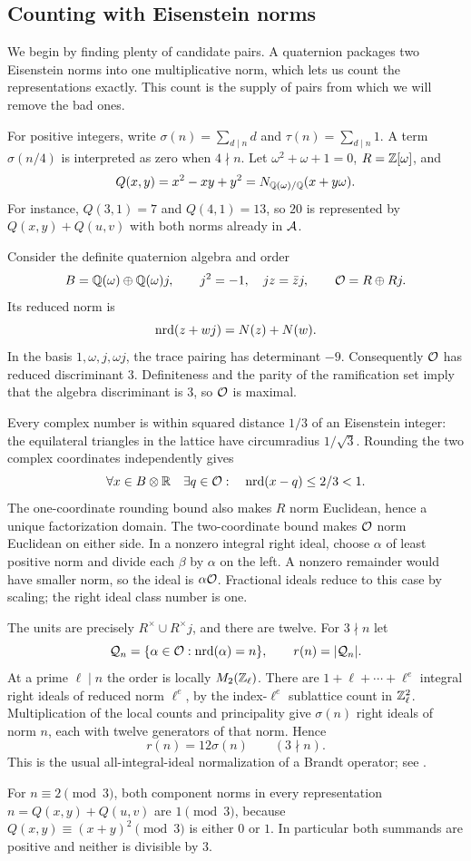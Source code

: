 \subsection{Counting with Eisenstein norms}\label{sec:norm}
We begin by finding plenty of candidate pairs. A quaternion packages two
Eisenstein norms into one multiplicative norm, which lets us count the
representations exactly. This count is the supply of pairs from which we
will remove the bad ones.

For positive integers, write $\sigma(n)=\sum_{d\mid n}d$ and
$\tau(n)=\sum_{d\mid n}1$. A term $\sigma(n/4)$ is interpreted as zero
when $4\nmid n$. Let $\omega^2+\omega+1=0$, $R=\Z[\omega]$, and
\[
Q(x,y)=x^2-xy+y^2=N_{\Q(\omega)/\Q}(x+y\omega).
\]
For instance, $Q(3,1)=7$ and $Q(4,1)=13$, so $20$ is represented by
$Q(x,y)+Q(u,v)$ with both norms already in $\AA$.

Consider the definite quaternion algebra and order
\[
B=\Q(\omega)\oplus\Q(\omega)j,\qquad
j^2=-1,\quad jz=\bar z j,\qquad \OO=R\oplus Rj.
\]
Its reduced norm is
\[
\nrd(z+w j)=N(z)+N(w).
\]
In the basis $1,\omega,j,\omega j$, the trace pairing has determinant $-9$.
Consequently $\OO$ has reduced discriminant $3$. Definiteness and the parity
of the ramification set imply that the algebra discriminant is $3$, so
$\OO$ is maximal.

Every complex number is within squared distance $1/3$ of an Eisenstein
integer: the equilateral triangles in the lattice have circumradius
$1/\sqrt3$. Rounding the two complex coordinates independently gives
\[
\forall x\in B\otimes\mathbb R\quad\exists q\in\OO:
\quad\nrd(x-q)\le2/3<1.
\]
The one-coordinate rounding bound also makes $R$ norm Euclidean, hence
a unique factorization domain. The two-coordinate bound makes $\OO$
norm Euclidean on either side. In a nonzero integral right
ideal, choose $\alpha$ of least positive norm and divide each $\beta$ by
$\alpha$ on the left. A nonzero remainder would have smaller norm, so the
ideal is $\alpha\OO$. Fractional ideals reduce to this case by scaling;
the right ideal class number is one.

The units are precisely $R^\times\cup R^\times j$, and there are twelve.
For $3\nmid n$ let
\[
\mathcal Q_n=\{\alpha\in\OO:\nrd(\alpha)=n\},\qquad r(n)=|\mathcal Q_n|.
\]
At a prime $\ell\mid n$ the order is locally $M_2(\Z_\ell)$. There are
$1+\ell+\cdots+\ell^e$ integral right ideals of reduced norm $\ell^e$,
by the index-$\ell^e$ sublattice count in $\Z_\ell^2$. Multiplication of
the local counts and principality give $\sigma(n)$ right ideals of norm
$n$, each with twelve generators of that norm. Hence
\begin{equation}\label{eq:count}
r(n)=12\sigma(n)\qquad(3\nmid n).
\end{equation}
This is the usual all-integral-ideal normalization of a Brandt operator;
see \cite[Proposition 41.3.1]{Voight}.

For $n\equiv2\pmod3$, both component norms in every representation
$n=Q(x,y)+Q(u,v)$ are $1\pmod3$, because
$Q(x,y)\equiv(x+y)^2\pmod3$ is either $0$ or $1$. In particular both
summands are positive and neither is divisible by $3$.
